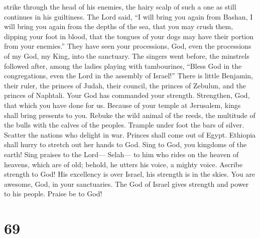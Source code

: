 strike through the head of his enemies, the hairy scalp of such a one as
still continues in his guiltiness.  The Lord said, ``I will
bring you again from Bashan, I will bring you again from the depths of
the sea,  that you may crush them, dipping your foot in
blood, that the tongues of your dogs may have their portion from your
enemies.''  They have seen your processions, God, even the
processions of my God, my King, into the sanctuary.  The
singers went before, the minstrels followed after, among the ladies
playing with tambourines,  ``Bless God in the
congregations, even the Lord in the assembly of Israel!'' 
There is little Benjamin, their ruler, the princes of Judah, their
council, the princes of Zebulun, and the princes of Naphtali.
 Your God has commanded your strength. Strengthen, God,
that which you have done for us.  Because of your temple at
Jerusalem, kings shall bring presents to you.  Rebuke the
wild animal of the reeds, the multitude of the bulls with the calves of
the peoples. Trample under foot the bars of silver. Scatter the nations
who delight in war.  Princes shall come out of Egypt.
Ethiopia shall hurry to stretch out her hands to God.  Sing
to God, you kingdoms of the earth! Sing praises to the Lord--- Selah---
 to him who rides on the heaven of heavens, which are of
old; behold, he utters his voice, a mighty voice.  Ascribe
strength to God! His excellency is over Israel, his strength is in the
skies.  You are awesome, God, in your sanctuaries. The God
of Israel gives strength and power to his people. Praise be to God!

\hypertarget{section-67}{%
\section{69}\label{section-67}}


